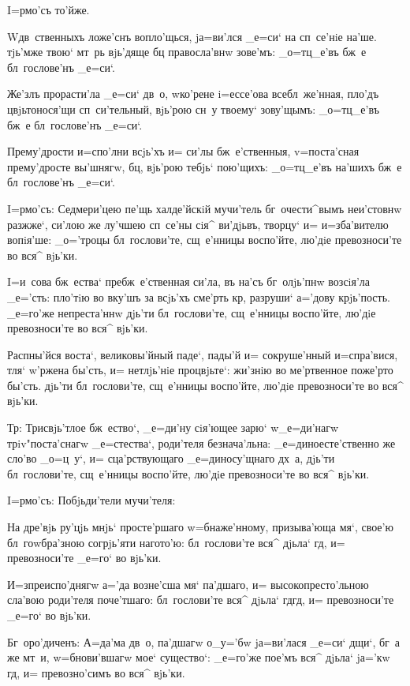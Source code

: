  I=рмо'съ то'йже.

W\т дв~ственныхъ ложе'снъ вопло'щься, jа=ви'лся _е=си` 
на сп~се'нiе на'ше. тjь'мже твою` мт~рь вjь'дяще бц 
правосла'внw зове'мъ: _о=тц_е'въ бж~е бл~гослове'нъ 
_е=си`.

Же'злъ прорасти'ла _е=си` дв~о, w\т ко'рене i=ессе'ова 
всебл~же'нная, пло'дъ цвjьтонося'щи сп~си'тельный, 
вjь'рою сн~у твоему` зову'щымъ: _о=тц_е'въ бж~е 
бл~гослове'нъ _е=си`.

Прему'дрости и=спо'лни всjь'хъ и= си'лы бж~е'ственныя, 
v=поста'сная прему'дросте вы'шнягw, бц, вjь'рою 
тебjь` пою'щихъ: _о=тц_е'въ на'шихъ бж~е бл~гослове'нъ 
_е=си`.


I=рмо'съ: Седмери'цею пе'щь халде'йскiй мучи'тель 
бг~очести^вымъ неи'стовнw разжже`, си'лою же лу'чшею 
сп~се'ны сiя^ ви'дjьвъ, творцу` и= и=зба'вителю вопiя'ше: 
_о='троцы бл~гослови'те, сщ~е'нницы воспо'йте, лю'дiе 
превозноси'те во вся^ вjь'ки.

I=и~сова бж~ества` пребж~е'ственная си'ла, въ на'съ 
бг~олjь'пнw возсiя'ла _е='сть: пло'тiю во вку'шъ за 
всjь'хъ сме'рть кр, разруши` а='дову крjь'пость. 
_е=го'же непреста'ннw дjь'ти бл~гослови'те, сщ~е'нницы 
воспо'йте, лю'дiе превозноси'те во вся^ вjь'ки.

Распны'йся воста`, великовы'йный паде`, пады'й и= 
сокруше'нный и=спра'вися, тля` w'ржена бы'сть, и= 
нетлjь'нiе процвjьте`: жи'знiю во ме'ртвенное поже'рто 
бы'сть. дjь'ти бл~гослови'те, сщ~е'нницы воспо'йте, 
лю'дiе превозноси'те во вся^ вjь'ки.

Тр: Трисвjь'тлое бж~ество`, _е=ди'ну сiя'ющее 
зарю` w\т _е=ди'нагw трiv"поста'снагw _е=стества`, 
роди'теля безнача'льна: _е=диноесте'ственно же сло'во 
_о=ц~у`, и= сца'рствующаго _е=диносу'щнаго дх~а, дjь'ти 
бл~гослови'те, сщ~е'нницы воспо'йте, лю'дiе превозноси'те 
во вся^ вjь'ки.

 I=рмо'съ: Побjьди'тели мучи'теля:

На дре'вjь ру'цjь мнjь` просте'ршаго w=бнаже'нному, 
призыва'юща мя`, свое'ю бл~гоwбра'зною согрjь'яти 
нагото'ю: бл~гослови'те вся^ дjьла` гд, и= 
превозноси'те _е=го` во вjь'ки.

И=з\ъ преиспо'днягw а='да возне'сша мя` па'дшаго, и= 
высокопресто'льною сла'вою роди'теля поче'тшаго: 
бл~гослови'те вся^ дjьла` гд гд, и= превозноси'те 
_е=го` во вjь'ки.

Бг~оро'диченъ: А=да'ма дв~о, па'дшагw о_у='бw 
jа=ви'лася _е=си` дщи`, бг~а же мт~и, w=бнови'вшагw мое` 
существо`: _е=го'же пое'мъ вся^ дjьла` jа='кw гд, и= 
превозно'симъ во вся^ вjь'ки.

